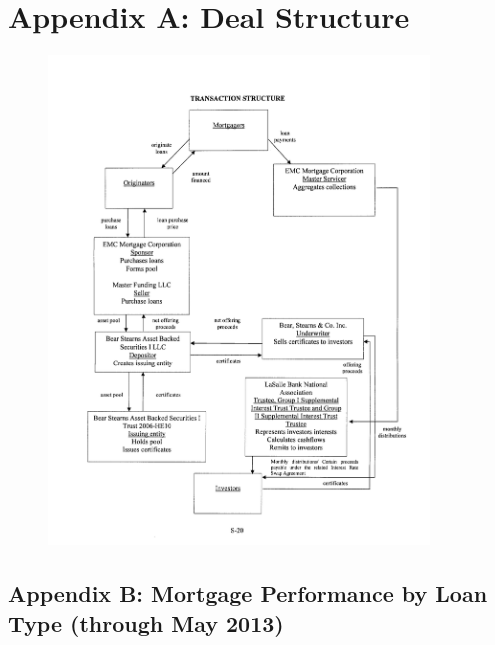 \documentclass[12pt]{article}
\begin{document}
\section*{Appendix A: Deal Structure}
\begin{figure}[h]
	\centering
	\includegraphics[width=0.9\textwidth]{../figures/deal_structure_from_prospectus}
\end{figure}


\newpage

\begin{landscape}
\section*{Appendix B: Mortgage Performance by Loan Type (through May 2013)}


\end{landscape}
\end{document}

